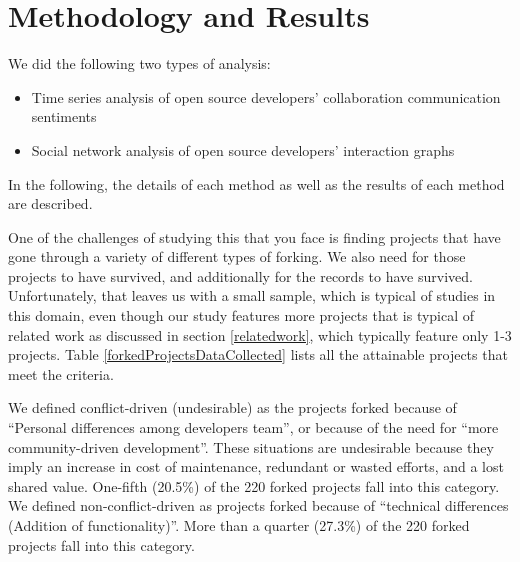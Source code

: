 \documentclass[12pt]{report}
\begin{document}
\section{Methodology and Results}
\label{methodology}

We did the following two types of analysis: 
\begin{itemize}
\item Time series analysis of open source developers’ collaboration communication sentiments
\item Social network analysis of open source developers’ interaction graphs
\end{itemize}
In the following, the details of each method as well as the results of each method are described.


One of the challenges of studying this that you face is finding projects that have gone through a variety of different types of forking. We also need for those projects to have survived, and additionally for the records to have survived. Unfortunately, that leaves us with a small sample, which is typical of studies in this domain, even  though our study features more projects that is typical of related work as discussed in section \ref{relatedwork}, which typically feature only 1-3 projects. Table \ref{forkedProjectsDataCollected} lists all the attainable projects that meet the criteria. 

We defined conflict-driven (undesirable) as the projects forked because of ``Personal differences among developers team'', or because of the need for ``more community-driven development''. These situations are undesirable because they imply an increase in cost of maintenance, redundant or wasted efforts, and a lost shared value. One-fifth (20.5\%) of the 220 forked projects fall into this category\cite{Robles}. We defined non-conflict-driven as projects forked because of ``technical differences (Addition of functionality)''. More than a quarter (27.3\%) of the 220 forked projects fall into this category\cite{Robles}.
\end{document}
